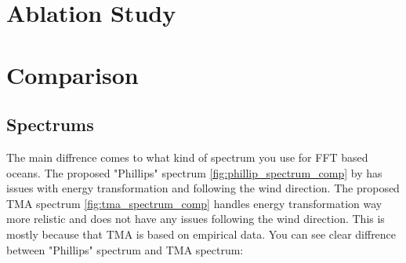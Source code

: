 \section{Ablation Study}


\section{Comparison} 

\subsection{Spectrums}
The main diffrence comes to what kind of spectrum you use for FFT based oceans. The proposed "Phillips" spectrum \ref{fig:phillip_spectrum_comp} by \cite[J. Tessendorf]{tessendorf2001} has issues with energy transformation and following the wind direction. 
The proposed TMA spectrum \ref{fig:tma_spectrum_comp} handles energy transformation way more relistic and does not have any issues following the wind direction. This is mostly because that TMA is based on empirical data.
You can see clear diffrence between "Phillips" spectrum and TMA spectrum:

